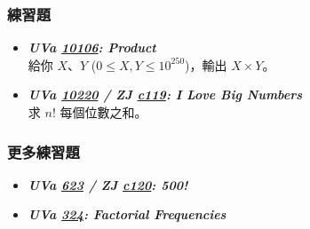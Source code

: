 \subsubsection*{練習題}
\begin{itemize}[label={\Checkmark}]
\item \textbf{\textit{UVa \href{http://uva.onlinejudge.org/external/101/10106.html}{10106}: Product}}\\
給你 $X$、$Y$ ($0\leq{X,Y}\leq{10^{250}}$)，輸出 $X\times{Y}$。
\item \textbf{\textit{UVa \href{http://uva.onlinejudge.org/external/102/10220.html}{10220} / ZJ \href{http://zerojudge.tw/ShowProblem?problemid=c119}{c119}: I Love Big Numbers}}\\
求 $n!$ 每個位數之和。
\end{itemize}
\subsubsection*{更多練習題}
\begin{itemize}[label={\PencilLeftDown}]
\item \textbf{\textit{UVa \href{http://uva.onlinejudge.org/external/6/623.html}{623} / ZJ \href{http://zerojudge.tw/ShowProblem?problemid=c120}{c120}: 500!}}
\item \textbf{\textit{UVa \href{http://uva.onlinejudge.org/external/3/324.html}{324}: Factorial Frequencies}}
\end{itemize}